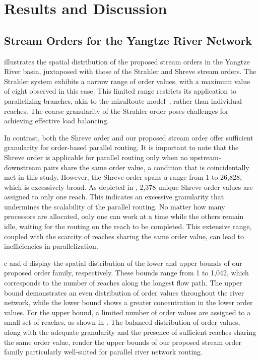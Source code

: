 \documentclass[water,article,submit,pdftex,moreauthors]{Definitions/mdpi}
\begin{document}
\section{Results and Discussion}
\label{sec:results}

\subsection{Stream Orders for the Yangtze River Network}
\label{sec:stream_order_yangtze}

 illustrates the spatial distribution of the proposed stream orders in the Yangtze River basin, juxtaposed with those of the Strahler and Shreve stream orders. The Strahler system exhibits a narrow range of order values, with a maximum value of eight observed in this case. This limited range restricts its application to parallelizing branches, akin to the mizuRoute model~\cite{mizukami2021JAMES}, rather than individual reaches. The coarse granularity of the Strahler order poses challenges for achieving effective load balancing.

In contrast, both the Shreve order and our proposed stream order offer sufficient granularity for order-based parallel routing. It is important to note that the Shreve order is applicable for parallel routing only when no upstream-downstream pairs share the same order value, a condition that is coincidentally met in this study. However, the Shreve order spans a range from 1 to 26,828, which is excessively broad. As depicted in , 2,378 unique Shreve order values are assigned to only one reach. This indicates an excessive granularity that undermines the scalability of the parallel routing. No matter how many processors are allocated, only one can work at a time while the others remain idle, waiting for the routing on the reach to be completed. This extensive range, coupled with the scarcity of reaches sharing the same order value, can lead to inefficiencies in parallelization.

c and d display the spatial distribution of the lower and upper bounds of our proposed order family, respectively. These bounds range from 1 to 1,042, which corresponds to the number of reaches along the longest flow path. The upper bound demonstrates an even distribution of order values throughout the river network, while the lower bound shows a greater concentration in the lower order values. For the upper bound, a limited number of order values are assigned to a small set of reaches, as shown in . The balanced distribution of order values, along with the adequate granularity and the presence of sufficient reaches sharing the same order value, render the upper bounds of our proposed stream order family particularly well-suited for parallel river network routing.
\end{document}
